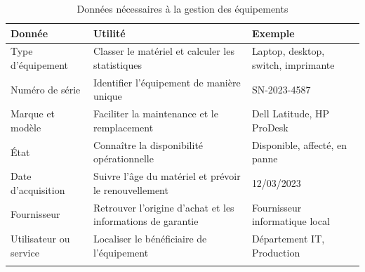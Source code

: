 \begin{longtable}{|m{4cm}|m{6cm}|m{4cm}|}
\hline
\textbf{Donnée} & \textbf{Utilité} & \textbf{Exemple} \\
\hline
\endhead
\endfoot
\endlastfoot
\hline
Type d'équipement & Classer le matériel et calculer les statistiques & Laptop, desktop, switch, imprimante \\
\hline
Numéro de série & Identifier l'équipement de manière unique & SN-2023-4587 \\
\hline
Marque et modèle & Faciliter la maintenance et le remplacement & Dell Latitude, HP ProDesk \\
\hline
État & Connaître la disponibilité opérationnelle & Disponible, affecté, en panne \\
\hline
Date d'acquisition & Suivre l'âge du matériel et prévoir le renouvellement & 12/03/2023 \\
\hline
Fournisseur & Retrouver l'origine d'achat et les informations de garantie & Fournisseur informatique local \\
\hline
Utilisateur ou service & Localiser le bénéficiaire de l'équipement & Département IT, Production \\
\hline
\captionsetup{justification=centering,margin=1cm}
\caption{Données nécessaires à la gestion des équipements}
\end{longtable}
